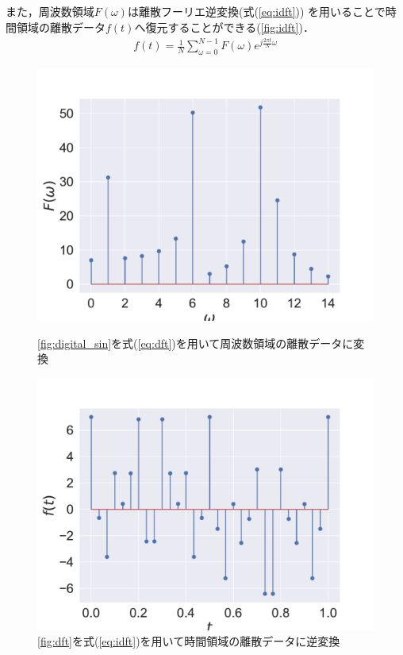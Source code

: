 また，周波数領域$F(\omega)$は離散フーリエ逆変換(式(\ref{eq:idft}))
を用いることで時間領域の離散データ$f(t)$へ復元することができる(\autoref{fig:idft})．
\begin{align}
  f(t) = \frac{1}{N}\sum_{\omega=0}^{N-1} F(\omega) e ^ {j \frac{2 \pi t}{N} \omega} \label{eq:idft}
\end{align}
\iffigure
\begin{figure}[h]
  \begin{minipage}{.45\hsize}
    \centering
    \includegraphics[clip, width=\textwidth]{figure/sin_dft.pdf}
    \caption{\autoref{fig:digital_sin}を式(\ref{eq:dft})を用いて周波数領域の離散データに変換}
    \label{fig:dft}
  \end{minipage}
  \begin{minipage}{.45\hsize}
    \centering
    \includegraphics[clip, width=\textwidth]{figure/sin_idft.pdf}
    \caption{\autoref{fig:dft}を式(\ref{eq:idft})を用いて時間領域の離散データに逆変換}
    \label{fig:idft}
  \end{minipage}
\end{figure}
\fi
